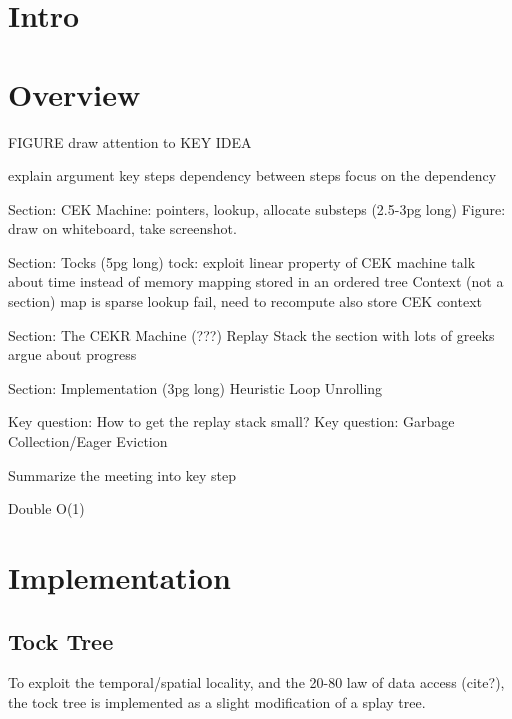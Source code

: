 \documentclass[acmsmall]{acmart}
\begin{document}
		
	
	
	\maketitle
	\section{Intro}
	\section{Overview}	
	FIGURE draw attention to KEY IDEA

explain argument
key steps
dependency between steps
focus on the dependency

Section: CEK Machine: pointers, lookup, allocate substeps (2.5-3pg long)
Figure: draw on whiteboard, take screenshot.

Section: Tocks (5pg long)
tock: exploit linear property of CEK machine
talk about time instead of memory
mapping stored in an ordered tree
Context (not a section)
map is sparse
lookup fail, need to recompute
also store CEK context

Section: The CEKR Machine (???)
Replay Stack
the section with lots of greeks
argue about progress

Section: Implementation (3pg long)
Heuristic
Loop Unrolling

Key question: How to get the replay stack small?
Key question: Garbage Collection/Eager Eviction

Summarize the meeting into key step

Double O(1)
	
	
	
	\section{Implementation}
	\subsection{Tock Tree}
	To exploit the temporal/spatial locality, and the 20-80 law of data access (cite?), the tock tree is implemented as a slight modification of a splay tree.
\end{document}
